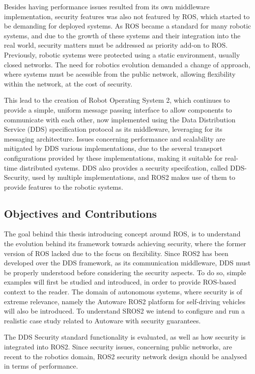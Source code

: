 Besides having performance issues resulted from its own middleware implementation, security features was also not featured by ROS, which started to be demanding for deployed systems. As ROS became a standard for many robotic systems, and due to the growth of these systems and their integration into the real world, security matters must be addressed as priority add-on to ROS. \cite{diluoffo2018robot, kim2018security} Previously, robotic systems were protected using a static environment, usually closed networks. The need for robotics evolution demanded a change of approach, where systems must be acessible from the public network, allowing flexibility within the network, at the cost of security.

This lead to the creation of Robot Operating System 2, which continues to provide a simple, uniform message passing interface to allow components to communicate with each other, now implemented using the Data Distribution Service (DDS)\cite{3} specification protocol as its middleware, leveraging for its messaging architecture. Issues concerning performance and scalability are mitigated by DDS various implementations, due to the several transport configurations provided by these implementations, making it suitable for real-time distributed systems. DDS also provides a security specifcation, called DDS-Security, used by multiple implementations, and ROS2 makes use of them to provide features to the robotic systems.\cite{8442103}


\subsection{Objectives and Contributions}

The goal behind this thesis introducing concept around ROS, is to understand the evolution behind its framework towards achieving security, where the former version of ROS lacked due to the focus on flexibility. Since ROS2 has been developed over the DDS framework, as its communication middleware, DDS must be properly understood before considering the security aspects. To do so, simple examples will first be studied and introduced, in order to provide ROS-based context to the reader. The domain of autonomous systems, where security is of extreme relevance, namely the Autoware \cite{8443742} ROS2 platform for self-driving vehicles will also be introduced. To understand SROS2 we intend to configure and run a realistic case study related to Autoware with security guarantees. 

The DDS Security standard functionality is evaluated, as well as how security is integrated into ROS2. Since security issues, concerning public networks, are recent to the robotics domain, ROS2 security network design should be analysed in terms of performance.  

